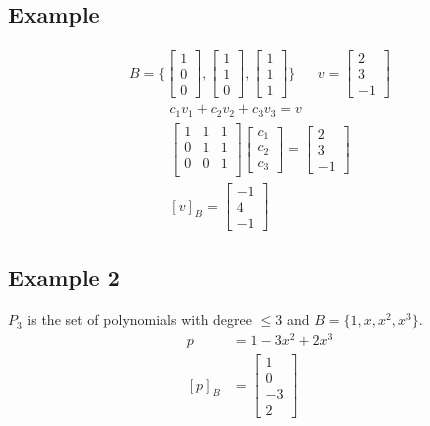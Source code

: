 \documentclass{article}
\theoremstyle{mytheoremstyle}
\theoremstyle{mytheoremstyle}
\theoremstyle{myproblemstyle}
\begin{document}
    \subsection*{Example}
    \begin{align*}
        B = \Bigg\{
            \begin{bmatrix}
                1 \\ 0 \\ 0
            \end{bmatrix},
            \begin{bmatrix}
                1 \\ 1 \\ 0
            \end{bmatrix},
            \begin{bmatrix}
                1 \\ 1 \\ 1
            \end{bmatrix}
        \Bigg\} && v = \begin{bmatrix}
            2 \\ 3 \\ -1
        \end{bmatrix}
    \end{align*}
    \begin{align*}
        c_1 v_1 + c_2 v_2 + c_3 v_3 = v \\
        \begin{bmatrix}
            1 & 1 & 1 \\
            0 & 1 & 1 \\
            0 & 0 & 1 \\
        \end{bmatrix} \begin{bmatrix}
            c_1 \\ c_2 \\ c_3
        \end{bmatrix} = \begin{bmatrix}
            2 \\ 3 \\ -1
        \end{bmatrix} \\
        [v]_B = \begin{bmatrix}
            -1 \\ 4 \\ -1
        \end{bmatrix}
    \end{align*}

    \subsection*{Example 2}
    $P_3$ is the set of polynomials with degree $\le 3$ and $B=\{1,x,x^2,x^3\}$.
    \begin{align*}
        p &= 1-3x^2+2x^3 \\
        [p]_B &= \begin{bmatrix}
            1 \\ 0 \\ -3 \\ 2
        \end{bmatrix}
    \end{align*}
\end{document}
